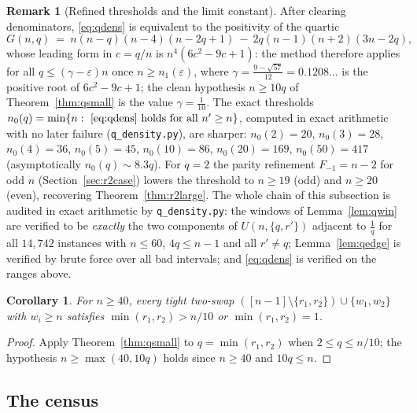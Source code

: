 \documentclass[11pt]{article}
\newtheorem{corollary}[theorem]{Corollary}
\theoremstyle{definition}
\newtheorem{remark}[theorem]{Remark}
\begin{document}
\begin{remark}[Refined thresholds and the limit constant]\label{rem:qrefine}
After clearing denominators, \eqref{eq:qdens} is equivalent to the
positivity of the quartic
\[
G(n,q)\ =\ n(n-q)(n-4)(n-2q+1)\ -\ 2q(n-1)(n+2)(3n-2q),
\]
whose leading form in $c=q/n$ is $n^{4}(6c^{2}-9c+1)$: the method
therefore applies for all $q\le(\gamma-\varepsilon)n$ once
$n\ge n_1(\varepsilon)$, where
$\gamma=\frac{9-\sqrt{57}}{12}=0.1208\ldots$ is the positive root of
$6c^2-9c+1$; the clean hypothesis $n\ge10q$ of Theorem~\ref{thm:qsmall}
is the value $\gamma=\tfrac1{10}$.  The exact thresholds
$n_0(q)=\min\{n:\ \eqref{eq:qdens}\text{ holds for all }n'\ge n\}$,
computed in exact arithmetic with no later failure
(\texttt{q\_density.py}), are sharper:
$n_0(2)=20$, $n_0(3)=28$, $n_0(4)=36$, $n_0(5)=45$, $n_0(10)=86$,
$n_0(20)=169$, $n_0(50)=417$ (asymptotically $n_0(q)\sim8.3q$).  For
$q=2$ the parity refinement $F_{-1}=n-2$ for odd $n$
(Section~\ref{sec:r2case}) lowers the threshold to $n\ge19$ (odd) and
$n\ge20$ (even), recovering Theorem~\ref{thm:r2large}.  The whole chain
of this subsection is audited in exact arithmetic by
\texttt{q\_density.py}: the windows of Lemma~\ref{lem:qwin} are verified
to be \emph{exactly} the two components of $U(n,\{q,r'\})$ adjacent to
$\tfrac1q$ for all $14{,}742$ instances with $n\le60$, $4q\le n-1$ and
all $r'\ne q$; Lemma~\ref{lem:qedge} is verified by brute force over all
bad intervals; and \eqref{eq:qdens} is verified on the ranges above.
\end{remark}

\begin{corollary}\label{cor:qcombine}
For $n\ge40$, every tight two-swap
$([n-1]\setminus\{r_1,r_2\})\cup\{w_1,w_2\}$ with $w_i\ge n$ satisfies
$\min(r_1,r_2)>n/10$ or $\min(r_1,r_2)=1$.
\end{corollary}

\begin{proof}
Apply Theorem~\ref{thm:qsmall} to $q=\min(r_1,r_2)$ when
$2\le q\le n/10$; the hypothesis $n\ge\max(40,10q)$ holds since
$n\ge40$ and $10q\le n$.
\end{proof}

\subsection{The census}\label{sec:census}
\end{document}
